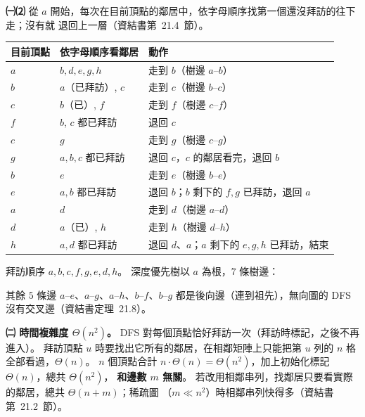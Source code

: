 \begin{pastsoln}
\textbf{㈠⑵} 從 $a$ 開始，每次在目前頂點的鄰居中，依字母順序找第一個還沒拜訪的往下走；沒有就
退回上一層（資結書第~21.4~節）。
\begin{center}
\small
\begin{tabular}{lll}
\toprule
目前頂點 & 依字母順序看鄰居 & 動作 \\
\midrule
$a$ & $b, d, e, g, h$ & 走到 $b$（樹邊 $a$--$b$） \\
$b$ & $a$（已拜訪）, $c$ & 走到 $c$（樹邊 $b$--$c$） \\
$c$ & $b$（已）, $f$ & 走到 $f$（樹邊 $c$--$f$） \\
$f$ & $b$, $c$ 都已拜訪 & 退回 $c$ \\
$c$ & $g$ & 走到 $g$（樹邊 $c$--$g$） \\
$g$ & $a, b, c$ 都已拜訪 & 退回 $c$，$c$ 的鄰居看完，退回 $b$ \\
$b$ & $e$ & 走到 $e$（樹邊 $b$--$e$） \\
$e$ & $a, b$ 都已拜訪 & 退回 $b$；$b$ 剩下的 $f, g$ 已拜訪，退回 $a$ \\
$a$ & $d$ & 走到 $d$（樹邊 $a$--$d$） \\
$d$ & $a$（已）, $h$ & 走到 $h$（樹邊 $d$--$h$） \\
$h$ & $a, d$ 都已拜訪 & 退回 $d$、$a$；$a$ 剩下的 $e, g, h$ 已拜訪，結束 \\
\bottomrule
\end{tabular}
\end{center}
拜訪順序 $a, b, c, f, g, e, d, h$。 深度優先樹以 $a$ 為根，$7$ 條樹邊：
\begin{center}
\end{center}
其餘 $5$ 條邊 $a$--$e$、$a$--$g$、$a$--$h$、$b$--$f$、$b$--$g$ 都是後向邊（連到祖先），無向圖的 DFS
沒有交叉邊（資結書定理~21.8）。

\textbf{㈡ 時間複雜度 $\Theta(n^2)$。} DFS 對每個頂點恰好拜訪一次（拜訪時標記，之後不再進入）。
拜訪頂點 $u$ 時要找出它所有的鄰居，在相鄰矩陣上只能把第 $u$ 列的 $n$ 格全部看過，$\Theta(n)$。
$n$ 個頂點合計 $n \cdot \Theta(n) = \Theta(n^2)$，加上初始化標記 $\Theta(n)$，總共 $\Theta(n^2)$，
\textbf{和邊數 $m$ 無關}。 若改用相鄰串列，找鄰居只要看實際的鄰居，總共 $\Theta(n + m)$；稀疏圖
（$m \ll n^2$）時相鄰串列快得多（資結書第~21.2~節）。


\end{pastsoln}

